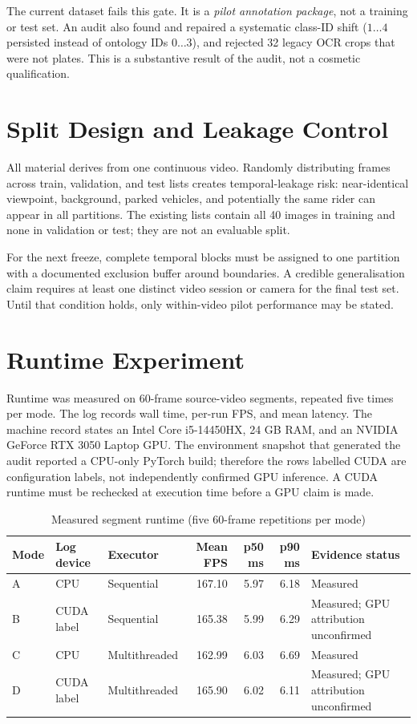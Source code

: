\documentclass[journal]{IEEEtran}
\begin{document}
The current dataset fails this gate. It is a \emph{pilot annotation package}, not a training or test set. An audit also found and repaired a systematic class-ID shift ($1\ldots4$ persisted instead of ontology IDs $0\ldots3$), and rejected 32 legacy OCR crops that were not plates. This is a substantive result of the audit, not a cosmetic qualification.

\section{Split Design and Leakage Control}
All material derives from one continuous video. Randomly distributing frames across train, validation, and test lists creates temporal-leakage risk: near-identical viewpoint, background, parked vehicles, and potentially the same rider can appear in all partitions. The existing lists contain all 40 images in training and none in validation or test; they are not an evaluable split.

For the next freeze, complete temporal blocks must be assigned to one partition with a documented exclusion buffer around boundaries. A credible generalisation claim requires at least one distinct video session or camera for the final test set. Until that condition holds, only within-video pilot performance may be stated.

\section{Runtime Experiment}
Runtime was measured on 60-frame source-video segments, repeated five times per mode. The log records wall time, per-run FPS, and mean latency. The machine record states an Intel Core i5-14450HX, 24 GB RAM, and an NVIDIA GeForce RTX 3050 Laptop GPU. The environment snapshot that generated the audit reported a CPU-only PyTorch build; therefore the rows labelled CUDA are configuration labels, not independently confirmed GPU inference. A CUDA runtime must be rechecked at execution time before a GPU claim is made.

\begin{table}[!t]\caption{Measured segment runtime (five 60-frame repetitions per mode)}\label{tab:runtime}\centering\begin{tabular}{l l l r r r p{3.2cm}}\toprule Mode&Log device&Executor&Mean FPS&p50 ms&p90 ms&Evidence status\\\midrule A&CPU&Sequential&167.10&5.97&6.18&Measured\\ B&CUDA label&Sequential&165.38&5.99&6.29&Measured; GPU attribution unconfirmed\\ C&CPU&Multithreaded&162.99&6.03&6.69&Measured\\ D&CUDA label&Multithreaded&165.90&6.02&6.11&Measured; GPU attribution unconfirmed\\\bottomrule\end{tabular}\end{table}
\end{document}

